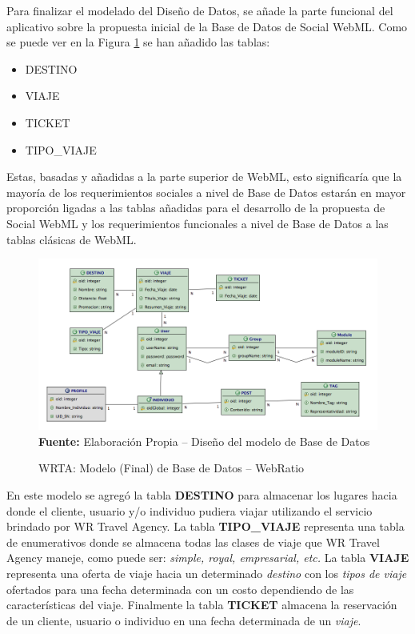 \documentclass[oneside,12pt,a4paper]{memoir}%
\begin{document}
	Para finalizar el modelado del Dise\~no de Datos, se a\~nade la parte
	funcional del aplicativo sobre la propuesta inicial de la Base de Datos de
	Social WebML. Como se puede ver en la Figura \ref{fig:WRTA_SocialDataModel} se han
	a\~nadido las tablas:
	
	\begin{itemize}
	  \item DESTINO
	  \item VIAJE
	  \item TICKET
	  \item TIPO\_VIAJE
	\end{itemize}
	
	Estas, basadas y a\~nadidas a la parte superior de \ac{WebML}, esto
	significar\'ia que la mayor\'ia de los requerimientos sociales a nivel de Base
	de Datos estar\'an en mayor proporci\'on ligadas a las tablas a\~nadidas para el
	desarrollo de la propuesta de Social WebML y los requerimientos funcionales a
	nivel de Base de Datos a las tablas cl\'asicas de \ac{WebML}.
	
	 \begin{figure}[here]
		\centering
		\caption{WRTA: Modelo (Final) de Base de Datos -- WebRatio}
		\includegraphics[width=1.0\textwidth]{figure/fig_WRTA_SocialDataModel.png}
		\newline
		\textbf{Fuente:} Elaboraci\'on Propia -- Dise\~no del modelo de Base de Datos
		\label{fig:WRTA_SocialDataModel}
	\end{figure}	
	
	En este modelo se agreg\'o la tabla \textbf{DESTINO} para almacenar los lugares
	hacia donde el cliente, usuario y/o individuo pudiera viajar utilizando el
	servicio brindado por WR Travel Agency. La tabla \textbf{TIPO\_VIAJE}
	representa una tabla de enumerativos donde se almacena todas las clases de viaje que WR Travel
	Agency maneje, como puede ser: \textit{simple, royal, empresarial, etc.} La
	tabla \textbf{VIAJE} representa una oferta de viaje hacia un determinado
	\textit{destino} con los \textit{tipos de viaje} ofertados para una fecha
	determinada con un costo dependiendo de las caracter\'isticas del viaje.
	Finalmente la tabla \textbf{TICKET} almacena la reservaci\'on de un cliente,
	usuario o individuo en una fecha determinada de un \textit{viaje}.
	
\end{document}
